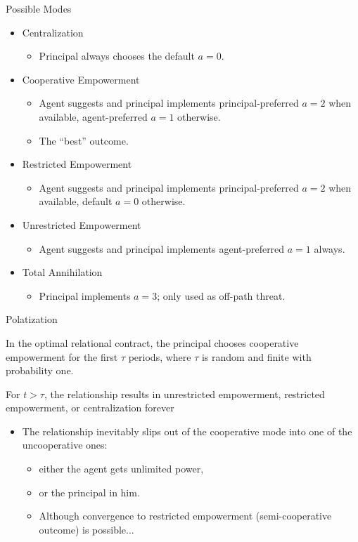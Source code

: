 \documentclass[english,10pt
,aspectratio=169
]{beamer}
\begin{document}
\begin{frame}{Possible Modes}
\begin{itemize}
	\item Centralization
	\begin{itemize}
		\item Principal always chooses the default $a=0$.
	\end{itemize}
	\item Cooperative Empowerment
	\begin{itemize}
		\item Agent suggests and principal implements principal-preferred $a=2$ when available, agent-preferred $a=1$ otherwise.
		\item The ``best'' outcome.
	\end{itemize}
	\item Restricted Empowerment
	\begin{itemize}
		\item Agent suggests and principal implements principal-preferred $a=2$ when available, default $a=0$ otherwise.
	\end{itemize}
	\item Unrestricted Empowerment
	\begin{itemize}
		\item Agent suggests and principal implements agent-preferred $a=1$ always.
	\end{itemize}
	\item Total Annihilation
	\begin{itemize}
		\item Principal implements $a=3$; only used as off-path threat.
	\end{itemize}
\end{itemize}
\end{frame}


\begin{frame}{Polatization}
\begin{theorem}
	In the optimal relational contract, the principal chooses cooperative empowerment for the first $\tau$ periods, where $\tau$ is random and finite with probability one.
	
	For $t > \tau$, the relationship results in unrestricted empowerment, restricted empowerment, or centralization forever
\end{theorem}
\begin{itemize}
	\item The relationship inevitably slips out of the cooperative mode into one of the uncooperative ones:
	\begin{itemize}
		\item either the agent gets \alert{unlimited power},
		\item or the principal  in him.
		\item Although convergence to restricted empowerment (semi-cooperative outcome) is possible...
	\end{itemize}
\end{itemize}
\end{frame}
\end{document}
